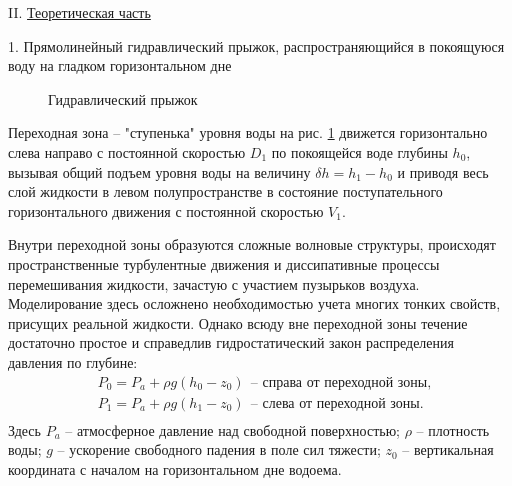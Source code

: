\documentclass[specialist, subf, href, colorlinks=true, 14pt, final]{disser}
\theoremstyle{definition}
\begin{document}
\noindent II. \underline{Теоретическая часть}

1. Прямолинейный гидравлический прыжок, распространяющийся в покоящуюся воду на гладком горизонтальном дне
\begin{figure}[!htp]
  \caption{Гидравлический прыжок}
  \label{1-4-1}
\end{figure}

Переходная зона -- "ступенька"{} уровня воды на рис. \ref{1-4-1} движется горизонтально слева направо с постоянной скоростью $D_1$ по покоящейся воде глубины $h_0$, вызывая общий подъем уровня воды на величину $\delta h = h_{1}-h_{0}$ и приводя весь слой жидкости в левом полупространстве в состояние поступательного горизонтального движения с постоянной скоростью $V_1$.

Внутри переходной зоны образуются сложные волновые структуры, происходят пространственные турбулентные движения и диссипативные процессы перемешивания жидкости, зачастую с участием пузырьков воздуха. Моделирование здесь осложнено необходимостью учета многих тонких свойств, присущих реальной жидкости. Однако всюду вне переходной зоны течение достаточно простое и справедлив гидростатический закон распределения давления по глубине:
\[
\begin{aligned}
&P_{0} = P_{a} + \rho g (h_{0}-z_{0})\ \ \text{-- справа от переходной зоны},\\
&P_{1} = P_{a} + \rho g (h_{1}-z_{0})\ \ \text{-- слева от переходной зоны}.\\
\end{aligned}
\]
Здесь $P_{a}$ -- атмосферное давление над свободной поверхностью; $\rho$ -- плотность воды; $g$ -- ускорение свободного падения в поле сил тяжести; $z_0$ -- вертикальная координата с началом на горизонтальном дне водоема.
\end{document}
